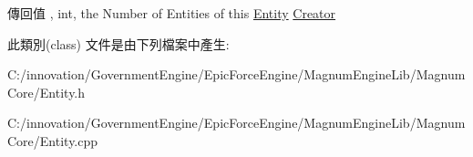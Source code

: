 \begin{DoxyReturn}{傳回值}
, int, the Number of Entities of this \hyperlink{class_i_dream_sky_1_1_entity}{Entity} \hyperlink{class_i_dream_sky_1_1_entity_1_1_creator}{Creator} 
\end{DoxyReturn}


此類別(class) 文件是由下列檔案中產生\+:\begin{DoxyCompactItemize}
\item 
C\+:/innovation/\+Government\+Engine/\+Epic\+Force\+Engine/\+Magnum\+Engine\+Lib/\+Magnum\+Core/Entity.\+h\item 
C\+:/innovation/\+Government\+Engine/\+Epic\+Force\+Engine/\+Magnum\+Engine\+Lib/\+Magnum\+Core/Entity.\+cpp\end{DoxyCompactItemize}
